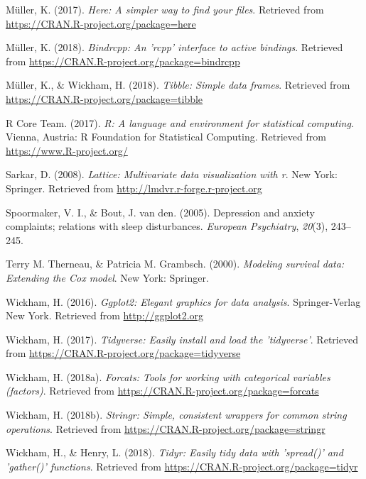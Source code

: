 \documentclass[man, noextraspace]{apa6}
\theoremstyle{definition}
\theoremstyle{definition}
\theoremstyle{definition}
\theoremstyle{remark}
\begin{document}
\hypertarget{ref-R-here}{}
Müller, K. (2017). \emph{Here: A simpler way to find your files}.
Retrieved from \url{https://CRAN.R-project.org/package=here}

\hypertarget{ref-R-bindrcpp}{}
Müller, K. (2018). \emph{Bindrcpp: An 'rcpp' interface to active
bindings}. Retrieved from
\url{https://CRAN.R-project.org/package=bindrcpp}

\hypertarget{ref-R-tibble}{}
Müller, K., \& Wickham, H. (2018). \emph{Tibble: Simple data frames}.
Retrieved from \url{https://CRAN.R-project.org/package=tibble}

\hypertarget{ref-R-base}{}
R Core Team. (2017). \emph{R: A language and environment for statistical
computing}. Vienna, Austria: R Foundation for Statistical Computing.
Retrieved from \url{https://www.R-project.org/}

\hypertarget{ref-R-lattice}{}
Sarkar, D. (2008). \emph{Lattice: Multivariate data visualization with
r}. New York: Springer. Retrieved from
\url{http://lmdvr.r-forge.r-project.org}

\hypertarget{ref-spoormaker2005depression}{}
Spoormaker, V. I., \& Bout, J. van den. (2005). Depression and anxiety
complaints; relations with sleep disturbances. \emph{European
Psychiatry}, \emph{20}(3), 243--245.

\hypertarget{ref-R-survival-book}{}
Terry M. Therneau, \& Patricia M. Grambsch. (2000). \emph{Modeling
survival data: Extending the Cox model}. New York: Springer.

\hypertarget{ref-R-ggplot2}{}
Wickham, H. (2016). \emph{Ggplot2: Elegant graphics for data analysis}.
Springer-Verlag New York. Retrieved from \url{http://ggplot2.org}

\hypertarget{ref-R-tidyverse}{}
Wickham, H. (2017). \emph{Tidyverse: Easily install and load the
'tidyverse'}. Retrieved from
\url{https://CRAN.R-project.org/package=tidyverse}

\hypertarget{ref-R-forcats}{}
Wickham, H. (2018a). \emph{Forcats: Tools for working with categorical
variables (factors)}. Retrieved from
\url{https://CRAN.R-project.org/package=forcats}

\hypertarget{ref-R-stringr}{}
Wickham, H. (2018b). \emph{Stringr: Simple, consistent wrappers for
common string operations}. Retrieved from
\url{https://CRAN.R-project.org/package=stringr}

\hypertarget{ref-R-tidyr}{}
Wickham, H., \& Henry, L. (2018). \emph{Tidyr: Easily tidy data with
'spread()' and 'gather()' functions}. Retrieved from
\url{https://CRAN.R-project.org/package=tidyr}
\end{document}
